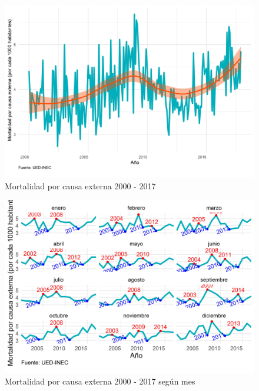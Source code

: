 \documentclass[
]{article}
\begin{document}
\begin{figure}[H]
\includegraphics[width=1\linewidth,height=1\textheight]{Tesis_files/figure-latex/externaplotgeneral-1} \caption{Mortalidad por causa externa 2000 - 2017}\label{fig:externaplotgeneral}
\end{figure}

\begin{figure}[H]
\includegraphics[width=1\linewidth,height=1\textheight]{Tesis_files/figure-latex/externasplotperiodos-1} \caption{Mortalidad por causa externa 2000 - 2017 según mes}\label{fig:externasplotperiodos}
\end{figure}
\end{document}
